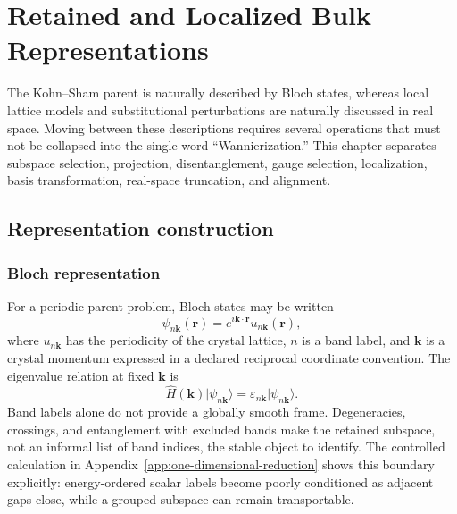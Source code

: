 \chapter{Retained and Localized Bulk Representations}

\label{ch:representations-and-alignment}


The Kohn--Sham parent is naturally described by Bloch states, whereas local
lattice models and substitutional perturbations are naturally discussed in
real space. Moving between these descriptions requires several operations that
must not be collapsed into the single word ``Wannierization.'' This chapter
separates subspace selection, projection, disentanglement, gauge selection,
localization, basis transformation, real-space truncation, and alignment.

\section{Representation construction}

\subsection{Bloch representation}


For a periodic parent problem, Bloch states may be written
\begin{equation}
  \psi_{n\mathbf k}(\mathbf r)
  =
  e^{i\mathbf k\cdot\mathbf r}u_{n\mathbf k}(\mathbf r),
\end{equation}
where $u_{n\mathbf k}$ has the periodicity of the crystal lattice, $n$ is a band
label, and $\mathbf k$ is a crystal momentum expressed in a declared reciprocal
coordinate convention. The eigenvalue relation at fixed $\mathbf k$ is
\begin{equation}
  \widehat H(\mathbf k)
  \lvert\psi_{n\mathbf k}\rangle
  =
  \varepsilon_{n\mathbf k}
  \lvert\psi_{n\mathbf k}\rangle.
\end{equation}
Band labels alone do not provide a globally smooth frame. Degeneracies,
crossings, and entanglement with excluded bands make the retained subspace, not
an informal list of band indices, the stable object to identify. The controlled
calculation in Appendix~\ref{app:one-dimensional-reduction} shows this boundary
explicitly: energy-ordered scalar labels become poorly conditioned as adjacent
gaps close, while a grouped subspace can remain transportable.

